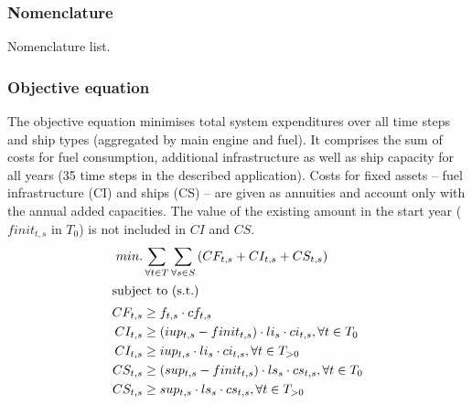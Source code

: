 \documentclass[article]{elsarticle}
\begin{document}
\subsubsection{Nomenclature}\label{box:nomenclature}
\glsdisablehyper
\glsaddall
\begin{table}[h]
\begin{mdframed}
\footnotesize{
\begin{multicols}{2}
\printglossary[style=tree,type=a]
\vspace{-0.3cm}
\printglossary[style=tree,type=s]
\vspace{-0.3cm}
\printglossary[style=tree,type=v]
\vspace{-0.3cm}
\printglossary[style=tree,type=p]
\end{multicols}
}
\end{mdframed}
\caption*{Nomenclature list.}
\end{table}

\subsubsection{Objective equation}
The objective equation minimises total system expenditures over all time steps and ship types (aggregated by main engine and fuel). It comprises the sum of  costs for fuel consumption, additional infrastructure as well as ship capacity for all years (35 time steps in the described application). Costs for fixed assets -- fuel infrastructure (CI) and ships (CS) -- are given as annuities and account only with the annual added capacities. The value of the existing amount in the start year ($finit_{t,s}$ in $T_0$) is not included in $CI$ and $CS$.
\begin{subequations}
    \begin{align}
        min. &\sum_{\forall t \in T}\sum_{\forall s \in S}\left( CF_{t, s} + CI_{t, s} + CS_{t, s} \right)\\
        \intertext{subject to (s.t.)}
        CF_{t, s} &\geq f_{t,s} \cdot cf_{t,s}\\
        CI_{t, s} &\geq \left( iup_{t,s} - finit_{t, s} \right) \cdot li_{s} \cdot ci_{t,s}, \forall t \in T_0\\
        CI_{t, s} &\geq iup_{t,s} \cdot li_{s} \cdot ci_{t,s}, \forall t \in T_{>0}\\
        CS_{t, s} &\geq \left( sup_{t,s} - finit_{t, s} \right) \cdot ls_{s} \cdot cs_{t,s}, \forall t \in T_0\\
        CS_{t, s} &\geq sup_{t,s} \cdot ls_{s} \cdot cs_{t,s}, \forall t \in T_{>0}
    \end{align}
\end{subequations}
\end{document}
